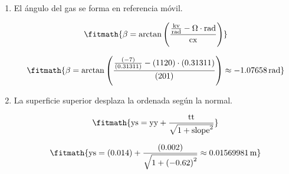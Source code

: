 \begin{enumerate}

\item El ángulo del gas se forma en referencia móvil.

\[\fitmath{\beta=\arctan\left(\frac{\frac{\mathrm{kv}}{\mathrm{rad}}-\Omega\cdot \mathrm{rad}}{\mathrm{cx}}\right)}\]

\[\fitmath{\beta=\arctan\left(\frac{\frac{(-7)}{(0.31311)}-(1120)\cdot (0.31311)}{(201)}\right)\approx -1.07658\,\mathrm{rad}}\]

\item La superficie superior desplaza la ordenada según la normal.

\[\fitmath{\mathrm{ys}=\mathrm{yy}+\frac{\mathrm{tt}}{\sqrt{1+{\mathrm{slope}}^{2}}}}\]

\[\fitmath{\mathrm{ys}=(0.014)+\frac{(0.002)}{\sqrt{1+{(-0.62)}^{2}}}\approx 0.01569981\,\mathrm{m}}\]

\end{enumerate}
